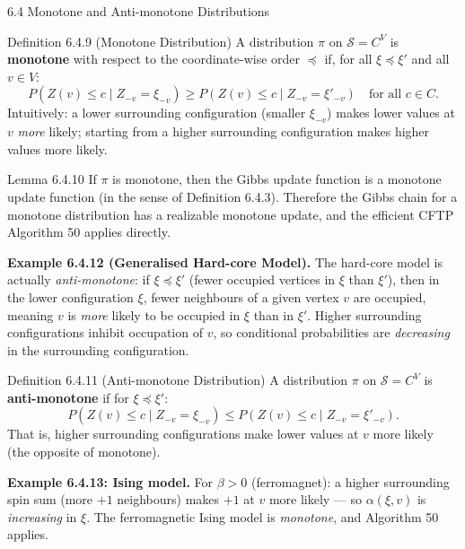 \documentclass[aspectratio=169,10pt]{beamer}
\begin{document}
\begin{frame}[allowframebreaks]{6.4 Monotone and Anti-monotone Distributions}

\begin{block}{Definition 6.4.9 (Monotone Distribution)}
A distribution $\pi$ on $\mathcal{S} = C^V$ is \textbf{monotone} with respect to the coordinate-wise order $\preceq$ if, for all $\xi \preceq \xi'$ and all $v \in V$:
\[
  P(Z(v) \le c \mid Z_{-v} = \xi_{-v}) \ge P(Z(v) \le c \mid Z_{-v} = \xi'_{-v}) \quad \text{for all } c \in C.
\]
Intuitively: a lower surrounding configuration (smaller $\xi_{-v}$) makes lower values at $v$ \emph{more} likely; starting from a higher surrounding configuration makes higher values more likely.
\end{block}

\begin{block}{Lemma 6.4.10}
If $\pi$ is monotone, then the Gibbs update function is a monotone update function (in the sense of Definition 6.4.3).
Therefore the Gibbs chain for a monotone distribution has a realizable monotone update, and the efficient CFTP Algorithm 50 applies directly.
\end{block}

\textbf{Example 6.4.12 (Generalised Hard-core Model).}
The hard-core model is actually \emph{anti-monotone}: if $\xi \preceq \xi'$ (fewer occupied vertices in $\xi$ than $\xi'$), then in the lower configuration $\xi$, fewer neighbours of a given vertex $v$ are occupied, meaning $v$ is \emph{more} likely to be occupied in $\xi$ than in $\xi'$.
Higher surrounding configurations inhibit occupation of $v$, so conditional probabilities are \emph{decreasing} in the surrounding configuration.

\framebreak

\begin{block}{Definition 6.4.11 (Anti-monotone Distribution)}
A distribution $\pi$ on $\mathcal{S} = C^V$ is \textbf{anti-monotone} if for $\xi \preceq \xi'$:
\[
  P(Z(v) \le c \mid Z_{-v} = \xi_{-v}) \le P(Z(v) \le c \mid Z_{-v} = \xi'_{-v}).
\]
That is, higher surrounding configurations make lower values at $v$ more likely (the opposite of monotone).
\end{block}

\textbf{Example 6.4.13: Ising model.}
For $\beta > 0$ (ferromagnet): a higher surrounding spin sum (more $+1$ neighbours) makes $+1$ at $v$ more likely --- so $\alpha(\xi,v)$ is \emph{increasing} in $\xi$.
The ferromagnetic Ising model is \emph{monotone}, and Algorithm 50 applies.


\end{frame}
\end{document}
